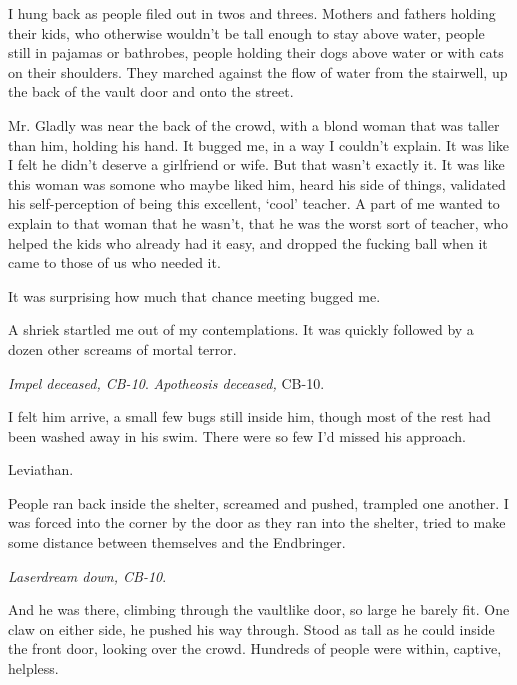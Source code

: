 I hung back as people filed out in twos and threes.  Mothers and fathers holding their kids, who otherwise wouldn't be tall enough to stay above water, people still in pajamas or bathrobes, people holding their dogs above water or with cats on their shoulders.  They marched against the flow of water from the stairwell, up the back of the vault door and onto the street.



Mr. Gladly was near the back of the crowd, with a blond woman that was taller than him, holding his hand.  It bugged me, in a way I couldn't explain.  It was like I felt he didn't deserve a girlfriend or wife.  But that wasn't exactly it.  It was like this woman was somone who maybe liked him, heard his side of things, validated his self-perception of being this excellent, `cool' teacher.  A part of me wanted to explain to that woman that he wasn't, that he was the worst sort of teacher, who helped the kids who already had it easy, and dropped the fucking ball when it came to those of us who needed it.



It was surprising how much that chance meeting bugged me.



A shriek startled me out of my contemplations.  It was quickly followed by a dozen other screams of mortal terror.



\emph{Impel deceased, CB-10}.  \emph{Apotheosis deceased,} CB-10.



\emph{ }I felt him arrive, a small few bugs still inside him, though most of the rest had been washed away in his swim.  There were so few I'd missed his approach.



Leviathan.



People ran back inside the shelter, screamed and pushed, trampled one another.  I was forced into the corner by the door as they ran into the shelter, tried to make some distance between themselves and the Endbringer.



\emph{Laserdream down, CB-10}.



And he was there, climbing through the vaultlike door, so large he barely fit.  One claw on either side, he pushed his way through.  Stood as tall as he could inside the front door, looking over the crowd.  Hundreds of people were within, captive, helpless.



